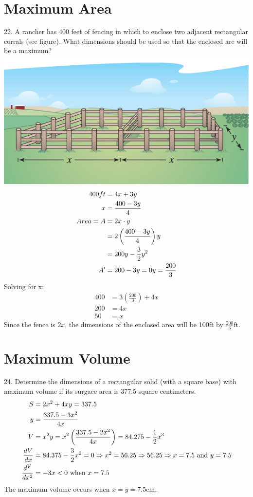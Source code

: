 \documentclass[11pt]{article}
\newcommand*{\set}{\setcounter{equation}{0}}
\begin{document}
\section{Maximum Area}
22. A rancher has 400 feet of fencing in which to enclose two adjacent rectangular corrals (see figure). What dimensions should be used so that the enclosed are will be a maximum?\\
\includegraphics{22.png}\\
\begin{align}
    \set
    400ft&=4x+3y\\
    x&=\frac{400-3y}{4}\\
    Area=A&=2x\cdot y\\
    &=2\left(\frac{400-3y}{4}\right)y\\
    &=200y-\frac{3}{2}y^2\\
    A'&=200-3y=0
    y=\frac{200}{3}
\end{align}
Solving for x:
\begin{align}
    400&=3\left(\frac{200}{3}\right)+4x\\
    200&=4x\\
    50&=x
\end{align}
Since the fence is $2x$, the dimensions of the enclosed area will be 100ft by $\frac{200}{3}$ft.

\section{Maximum Volume}
24. Determine the dimensions of a rectangular solid (with a square base) with maximum volume if its surgace area is 377.5 square centimeters.
\begin{align}
    \set
    S&=2x^2+4xy=337.5\\
    y&=\frac{337.5-3x^2}{4x}\\
    V&=x^2y=x^2\left(\frac{337.5-2x^2}{4x}\right)=84.275-\frac{1}{2}x^3\\
    \frac{dV}{dx}&=84.375-\frac{3}{2}x^2=0\Rightarrow x^2=56.25\Rightarrow 56.25\Rightarrow x=7.5\,\,\text{and}\,\, y=7.5\\
    \frac{d^V}{dx^2}&=-3x<0\,\,\text{when}\,\, x=7.5
\end{align}
The maximum volume occurs when $x=y=7.5$cm.
\end{document}
